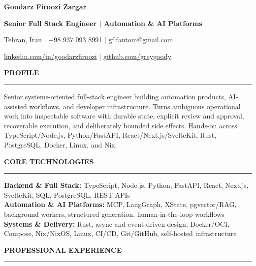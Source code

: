 \documentclass[10pt,a4paper]{article}
\newcommand{\cvsection}[1]{%
  \Needspace{4\baselineskip}%
  \vspace{0.42em}%
  {\fontsize{10.2}{11.9}\selectfont\bfseries\color{navy}\MakeUppercase{#1}}\par
  \vspace{0.16em}\color{rule}\hrule\color{text}\vspace{0.30em}%
}
\begin{document}
\fontsize{10.25}{12.45}\selectfont

\begin{center}
  {\fontsize{21}{23}\selectfont\bfseries\color{navy}Goodarz Firoozi Zargar}\par
  \vspace{0.10em}
  {\fontsize{11.25}{13.1}\selectfont\bfseries\color{teal}Senior Full Stack Engineer | Automation \& AI Platforms}\par
  \vspace{0.24em}
  {\fontsize{9.05}{10.7}\selectfont\color{muted}
  Tehran, Iran | \href{tel:+989370938991}{+98 937 093 8991} | \href{mailto:gf.fantom@gmail.com}{gf.fantom@gmail.com}}\par
  {\fontsize{9.05}{10.7}\selectfont
  \href{https://www.linkedin.com/in/goodarzfiroozi}{linkedin.com/in/goodarzfiroozi} | \href{https://github.com/greygoody}{github.com/greygoody}}
\end{center}

\cvsection{Profile}

Senior systems-oriented full-stack engineer building automation products, AI-assisted workflows, and developer infrastructure. Turns ambiguous operational work into inspectable software with durable state, explicit review and approval, recoverable execution, and deliberately bounded side effects. Hands-on across TypeScript/Node.js, Python/FastAPI, React/Next.js/SvelteKit, Rust, PostgreSQL, Docker, Linux, and Nix.

\cvsection{Core Technologies}

\textbf{Backend \& Full Stack:} TypeScript, Node.js, Python, FastAPI, React, Next.js, SvelteKit, SQL, PostgreSQL, REST APIs\\
\textbf{Automation \& AI Platforms:} MCP, LangGraph, XState, pgvector/RAG, background workers, structured generation, human-in-the-loop workflows\\
\textbf{Systems \& Delivery:} Rust, async and event-driven design, Docker/OCI, Compose, Nix/NixOS, Linux, CI/CD, Git/GitHub, self-hosted infrastructure

\cvsection{Professional Experience}
\end{document}
